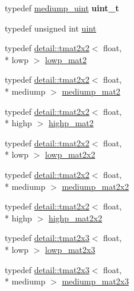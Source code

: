 \begin{DoxyCompactItemize}
\item 
\hypertarget{group__core__precision_ga5f2ae871c284c9d39ae8fdbb1305b566}{typedef \hyperlink{group__core__precision_ga08ae38ad78ade3539fdd1d25052b8c51}{mediump\-\_\-uint} {\bfseries uint\-\_\-t}}\label{group__core__precision_ga5f2ae871c284c9d39ae8fdbb1305b566}

\item 
typedef unsigned int \hyperlink{group__core__precision_ga4fd29415871152bfb5abd588334147c8}{uint}
\item 
typedef \hyperlink{structglm_1_1detail_1_1tmat2x2}{detail\-::tmat2x2}$<$ float, \\*
lowp $>$ \hyperlink{group__core__precision_gac0acc3ccf8da050af3393ea639f698d6}{lowp\-\_\-mat2}
\item 
typedef \hyperlink{structglm_1_1detail_1_1tmat2x2}{detail\-::tmat2x2}$<$ float, \\*
mediump $>$ \hyperlink{group__core__precision_ga6ed8bfa67b72cea216cb558411f95f86}{mediump\-\_\-mat2}
\item 
typedef \hyperlink{structglm_1_1detail_1_1tmat2x2}{detail\-::tmat2x2}$<$ float, \\*
highp $>$ \hyperlink{group__core__precision_gab9884251d84b95dbbf27aa1e4b3a1ec7}{highp\-\_\-mat2}
\item 
typedef \hyperlink{structglm_1_1detail_1_1tmat2x2}{detail\-::tmat2x2}$<$ float, \\*
lowp $>$ \hyperlink{group__core__precision_ga7d7e123d953978cc17de6882bb10400e}{lowp\-\_\-mat2x2}
\item 
typedef \hyperlink{structglm_1_1detail_1_1tmat2x2}{detail\-::tmat2x2}$<$ float, \\*
mediump $>$ \hyperlink{group__core__precision_ga867b486aea2d228a1e1a134af73b2c4b}{mediump\-\_\-mat2x2}
\item 
typedef \hyperlink{structglm_1_1detail_1_1tmat2x2}{detail\-::tmat2x2}$<$ float, \\*
highp $>$ \hyperlink{group__core__precision_ga694146b8d430b22caa8b37571d9bc8bc}{highp\-\_\-mat2x2}
\item 
typedef \hyperlink{structglm_1_1detail_1_1tmat2x3}{detail\-::tmat2x3}$<$ float, \\*
lowp $>$ \hyperlink{group__core__precision_gaef481e637af5103a83ab561d30d28f2a}{lowp\-\_\-mat2x3}
\item 
typedef \hyperlink{structglm_1_1detail_1_1tmat2x3}{detail\-::tmat2x3}$<$ float, \\*
mediump $>$ \hyperlink{group__core__precision_gad4e099c0dfa8f35ce9c0ddc8605428cf}{mediump\-\_\-mat2x3}

\end{DoxyCompactItemize}
